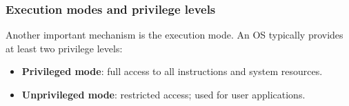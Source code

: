 
\subsubsection{Execution modes and privilege levels}

Another important mechanism is the execution mode.
An OS typically provides at least two privilege levels:

\begin{itemize}
    \item \textbf{Privileged mode}: full access to all instructions and system resources.
    \item \textbf{Unprivileged mode}: restricted access; used for user applications.
\end{itemize}

